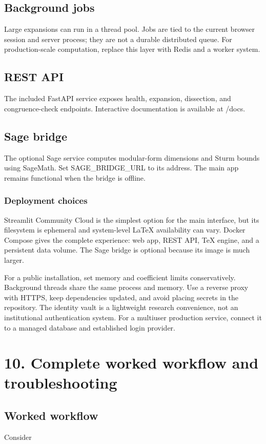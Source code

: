 \documentclass[11pt]{article}
\begin{document}
\subsection*{Background jobs}
Large expansions can run in a thread pool. Jobs are tied to the current browser session and server process; they are not a durable distributed queue. For production-scale computation, replace this layer with Redis and a worker system.

\subsection*{REST API}
The included FastAPI service exposes health, expansion, dissection, and congruence-check endpoints. Interactive documentation is available at /docs.

\subsection*{Sage bridge}
The optional Sage service computes modular-form dimensions and Sturm bounds using SageMath. Set SAGE\_BRIDGE\_URL to its address. The main app remains functional when the bridge is offline.

\subsubsection*{Deployment choices}
Streamlit Community Cloud is the simplest option for the main interface, but its filesystem is ephemeral and system-level LaTeX availability can vary. Docker Compose gives the complete experience: web app, REST API, TeX engine, and a persistent data volume. The Sage bridge is optional because its image is much larger.

For a public installation, set memory and coefficient limits conservatively. Background threads share the same process and memory. Use a reverse proxy with HTTPS, keep dependencies updated, and avoid placing secrets in the repository. The identity vault is a lightweight research convenience, not an institutional authentication system. For a multiuser production service, connect it to a managed database and established login provider.

\newpage
\section{10. Complete worked workflow and troubleshooting}
\subsection*{Worked workflow}
Consider
\end{document}
